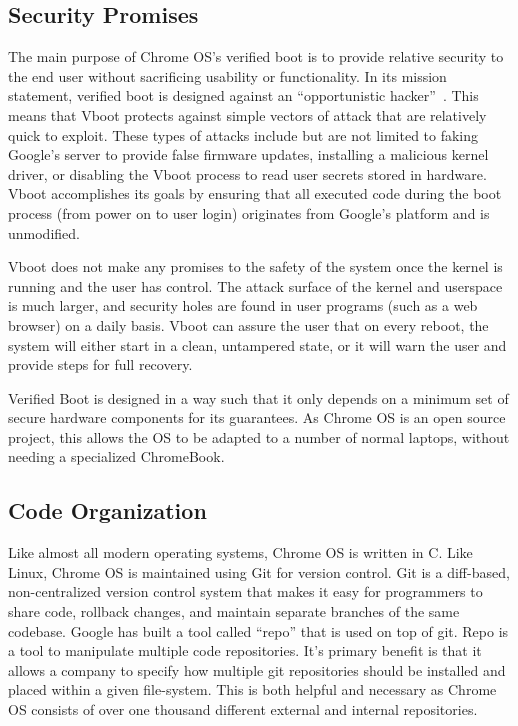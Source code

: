 \newpage
{}

\subsection{Security Promises}

The main purpose of Chrome OS's verified boot is to provide relative security to the end user without sacrificing usability or functionality. 
In its mission statement, verified boot is designed against an ``opportunistic hacker''~\cite{vboot_doc}.
This means that Vboot protects against simple vectors of attack that are relatively quick to exploit.
These types of attacks include but are not limited to faking Google's server to provide false firmware updates, installing a malicious kernel driver, or disabling the Vboot process to read user secrets stored in hardware.
Vboot accomplishes its goals by ensuring that all executed code during the boot process (from power on to user login) originates from Google's platform and is unmodified. 

Vboot does not make any promises to the safety of the system once the kernel is running and the user has control. 
The attack surface of the kernel and userspace is much larger, and security holes are found in user programs (such as a web browser) on a daily basis.
Vboot can assure the user that on every reboot, the system will either start in a clean, untampered state, or it will warn the user and provide steps for full recovery.

Verified Boot is designed in a way such that it only depends on a minimum set of secure hardware components for its guarantees.
As Chrome OS is an open source project, this allows the OS to be adapted to a number of normal laptops, without needing a specialized ChromeBook.

\subsection{Code Organization}

Like almost all modern operating systems, Chrome OS is written in C.
Like Linux, Chrome OS is maintained using Git for version control. 
Git is a diff-based, non-centralized version control system that makes it easy for programmers to share code, rollback changes, and maintain separate branches of the same codebase.
Google has built a tool called ``repo'' that is used on top of git. 
Repo is a tool to manipulate multiple code repositories. 
It's primary benefit is that it allows a company to specify how multiple git repositories should be installed and placed within a given file-system.
This is both helpful and necessary as Chrome OS consists of over one thousand different external and internal repositories. 

